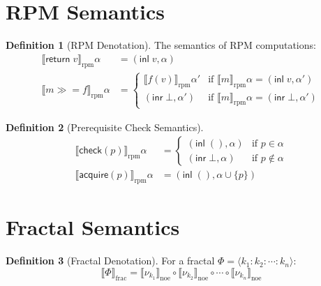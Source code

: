 \documentclass[11pt,twoside,openright]{book}
\theoremstyle{definition}
\newtheorem{definition}{Definition}[chapter]
\theoremstyle{plain}
\theoremstyle{remark}
\newcommand{\noe}[1]{\nu_{#1}}
\newcommand{\rpmret}{\mathsf{return}}
\newcommand{\rpmbind}{\mathbin{\gg\!=}}
\newcommand{\Frac}{\Phi}
\begin{document}
\section{RPM Semantics}

\begin{definition}[RPM Denotation]
\label{def:rpm-denotation}
The semantics of RPM computations:
\begin{align}
\llbracket \rpmret\; v \rrbracket_{\text{rpm}} \alpha &= (\mathsf{inl}\; v, \alpha) \\
\llbracket m \rpmbind f \rrbracket_{\text{rpm}} \alpha &=
  \begin{cases}
    \llbracket f(v) \rrbracket_{\text{rpm}} \alpha' & \text{if } \llbracket m \rrbracket_{\text{rpm}} \alpha = (\mathsf{inl}\; v, \alpha') \\
    (\mathsf{inr}\; \bot, \alpha') & \text{if } \llbracket m \rrbracket_{\text{rpm}} \alpha = (\mathsf{inr}\; \bot, \alpha')
  \end{cases}
\end{align}
\end{definition}

\begin{definition}[Prerequisite Check Semantics]
\label{def:prereq-denotation}
\begin{align}
\llbracket \mathsf{check}(p) \rrbracket_{\text{rpm}} \alpha &=
  \begin{cases}
    (\mathsf{inl}\; (), \alpha) & \text{if } p \in \alpha \\
    (\mathsf{inr}\; \bot, \alpha) & \text{if } p \notin \alpha
  \end{cases} \\
\llbracket \mathsf{acquire}(p) \rrbracket_{\text{rpm}} \alpha &= (\mathsf{inl}\; (), \alpha \cup \{p\})
\end{align}
\end{definition}

\section{Fractal Semantics}

\begin{definition}[Fractal Denotation]
\label{def:fractal-denotation}
For a fractal $\Frac = \langle k_1 : k_2 : \cdots : k_n \rangle$:
\[
\llbracket \Frac \rrbracket_{\text{frac}} = \llbracket \noe{k_1} \rrbracket_{\text{noe}} \circ \llbracket \noe{k_2} \rrbracket_{\text{noe}} \circ \cdots \circ \llbracket \noe{k_n} \rrbracket_{\text{noe}}
\]
\end{definition}
\end{document}
